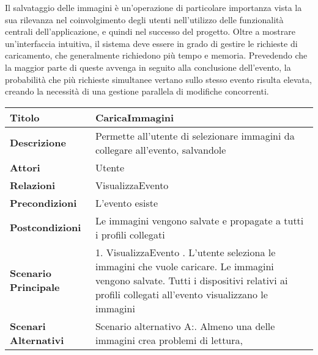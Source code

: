 Il salvataggio delle immagini è un'operazione di particolare importanza vista la sua rilevanza
nel coinvolgimento degli utenti nell'utilizzo delle funzionalità centrali dell'applicazione, e quindi nel successo del progetto.
Oltre a mostrare un'interfaccia intuitiva, il sistema deve essere in grado di gestire le richieste di caricamento,
che generalmente richiedono più tempo e memoria.
Prevedendo che la maggior parte di queste avvenga in seguito alla conclusione dell'evento,
la probabilità che più richieste simultanee vertano sullo stesso evento risulta elevata,
creando la necessità di una gestione parallela di modifiche concorrenti.

\begin{table}[htb]
    \begin{tabular} {|P{4.5cm}|P{11cm}|}
        \hline
        \textbf{Titolo}                   & CaricaImmagini                                                                  \\
        \hline
        \textbf{Descrizione}              & Permette all'utente di selezionare immagini da collegare all'evento, salvandole \\
        \hline
        \textbf{Attori}                   & Utente                                                                          \\
        \hline
        \textbf{Relazioni}                & VisualizzaEvento                                                                \\
        \hline
        \textbf{Precondizioni}            & L'evento esiste                                                                 \\
        \hline
        \textbf{Postcondizioni}           & Le immagini vengono salvate e propagate a tutti i profili collegati             \\
        \hline
        \textbf{Scenario Principale}      & 1. VisualizzaEvento . L'utente seleziona le immagini che vuole caricare. Le immagini vengono salvate. Tutti i dispositivi relativi ai profili collegati all'evento visualizzano le immagini                            \\
        \hline
        \textbf{Scenari Alternativi}      &
        Scenario alternativo A:. Almeno una delle immagini crea problemi di lettura,

\end{tabular}
\end{table}
